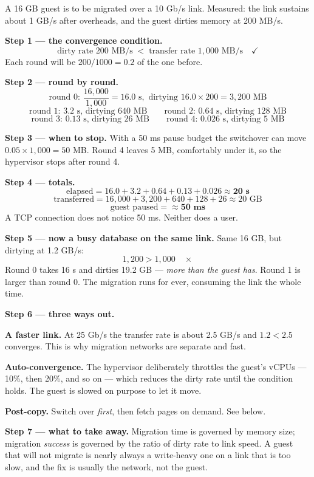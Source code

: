 \begin{worked}
A 16 GB guest is to be migrated over a 10 Gb/s link. Measured: the link
sustains about 1 GB/s after overheads, and the guest dirties memory at 200 MB/s.

\smallskip
\textbf{Step 1 --- the convergence condition.}
\[ \text{dirty rate } 200 \text{ MB/s} \;<\; \text{transfer rate }
   1{,}000 \text{ MB/s} \quad \checkmark \]
Each round will be $200/1000 = 0.2$ of the one before.

\smallskip
\textbf{Step 2 --- round by round.}
\[ \text{round 0: } \frac{16{,}000}{1{,}000} = 16.0 \text{ s},
   \text{ dirtying } 16.0 \times 200 = 3{,}200 \text{ MB} \]
\[ \text{round 1: } 3.2 \text{ s, dirtying } 640 \text{ MB} \qquad
   \text{round 2: } 0.64 \text{ s, dirtying } 128 \text{ MB} \]
\[ \text{round 3: } 0.13 \text{ s, dirtying } 26 \text{ MB} \qquad
   \text{round 4: } 0.026 \text{ s, dirtying } 5 \text{ MB} \]

\smallskip
\textbf{Step 3 --- when to stop.} With a 50 ms pause budget the switchover can
move $0.05 \times 1{,}000 = 50$ MB. Round 4 leaves 5 MB, comfortably under it,
so the hypervisor stops after round 4.

\smallskip
\textbf{Step 4 --- totals.}
\[ \text{elapsed} = 16.0 + 3.2 + 0.64 + 0.13 + 0.026 \approx \mathbf{20
   \text{ s}} \]
\[ \text{transferred} = 16{,}000 + 3{,}200 + 640 + 128 + 26 \approx 20
   \text{ GB} \]
\[ \text{guest paused} = \mathbf{\approx 50 \text{ ms}} \]
A TCP connection does not notice 50 ms. Neither does a user.

\smallskip
\textbf{Step 5 --- now a busy database on the same link.} Same 16 GB, but
dirtying at 1.2 GB/s:
\[ 1{,}200 > 1{,}000 \quad \times \]
Round 0 takes 16 s and dirties 19.2 GB --- \emph{more than the guest has}.
Round 1 is larger than round 0. The migration runs for ever, consuming the link
the whole time.

\smallskip
\textbf{Step 6 --- three ways out.}
\begin{tight}
  \item \textbf{A faster link.} At 25 Gb/s the transfer rate is about 2.5 GB/s
        and $1.2 < 2.5$ converges. This is why migration networks are
        separate and fast.
  \item \textbf{Auto-convergence.} The hypervisor deliberately throttles the
        guest's vCPUs --- 10\%, then 20\%, and so on --- which reduces the
        dirty rate until the condition holds. The guest is slowed on purpose
        to let it move.
  \item \textbf{Post-copy.} Switch over \emph{first}, then fetch pages on
        demand. See below.
\end{tight}

\smallskip
\textbf{Step 7 --- what to take away.} Migration time is governed by memory
size; migration \emph{success} is governed by the ratio of dirty rate to link
speed. A guest that will not migrate is nearly always a write-heavy one on a
link that is too slow, and the fix is usually the network, not the guest.
\end{worked}

